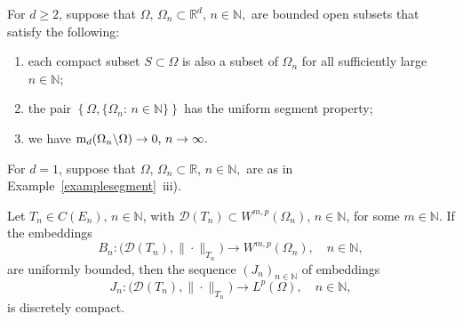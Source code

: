 \documentclass[a4paper,reqno]{amsart}
\begin{document}
\begin{theorem}\label{thmsobolev}
For $d\geq 2$, 
suppose that $\Omega,\,\Omega_n\subset{\mathbb{R}}^d$, $n\in{\mathbb{N}},$ are bounded open subsets that satisfy the following:
\begin{enumerate}[label=\rm{(\roman{*})}]
\item  each compact subset $S\subset\Omega$ is also a subset of $\Omega_n$ for all sufficiently large $n\in{\mathbb{N}}$;
\item the pair  $\left\{\Omega, \{\Omega_n:\,n\in{\mathbb{N}}\}\right\}$  has the uniform segment property;
\item we have ${\rm m}_d(\Omega_n\backslash\Omega)\to 0, \, n\to\infty.$ 
\end{enumerate}
For $d=1$,  suppose that $\Omega,\,\Omega_n\subset{\mathbb{R}}$, $n\in{\mathbb{N}},$ are as in Example~{\rm\ref{examplesegment}~iii)}. 

 Let $T_n\in C(E_n), \,n\in{\mathbb{N}}$, with ${\mathcal D}(T_n)\subset W^{m,p}(\Omega_n)$, $n\in{\mathbb{N}}$, for some $m\in{\mathbb{N}}$. 
If the embeddings $$B_n: \big({\mathcal D}(T_n),\|\cdot\|_{T_n}\big)\to W^{m,p}(\Omega_n), \quad n\in{\mathbb{N}},$$
 are uniformly bounded, then the sequence $(J_n)_{n\in{\mathbb{N}}}$ of embeddings $$J_n: \big({\mathcal D}(T_n),\|\cdot\|_{T_n}\big)\to L^p(\Omega), \quad  n\in{\mathbb{N}},$$ is discretely compact.
\end{theorem}
\end{document}
